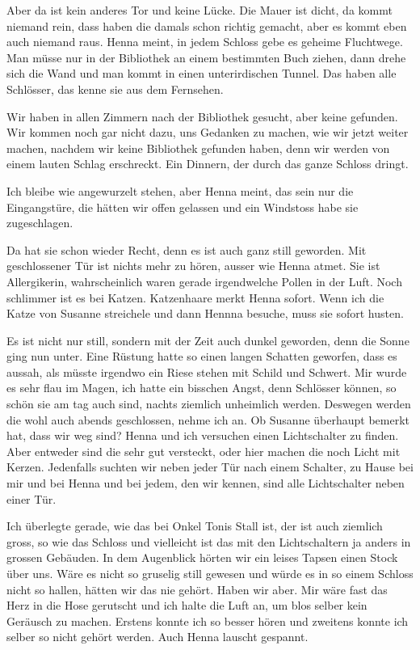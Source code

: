 Aber da ist kein anderes Tor und keine Lücke. Die Mauer ist dicht, da kommt niemand rein, dass haben die damals schon richtig gemacht, aber es kommt eben auch niemand raus. Henna meint, in jedem Schloss gebe es geheime Fluchtwege. Man müsse nur in der Bibliothek an einem bestimmten Buch ziehen, dann drehe sich die Wand und man kommt in einen unterirdischen Tunnel. Das haben alle Schlösser, das kenne sie aus dem Fernsehen.

Wir haben in allen Zimmern nach der Bibliothek gesucht, aber keine gefunden. Wir kommen noch gar nicht dazu, uns Gedanken zu machen, wie wir jetzt weiter machen, nachdem wir keine Bibliothek gefunden haben, denn wir werden von einem lauten Schlag erschreckt. Ein Dinnern, der durch das ganze Schloss dringt.

Ich bleibe wie angewurzelt stehen, aber Henna meint, das sein nur die Eingangstüre, die hätten wir offen gelassen und ein Windstoss habe sie zugeschlagen.

Da hat sie schon wieder Recht, denn es ist auch ganz still geworden. Mit geschlossener Tür ist nichts mehr zu hören, ausser wie Henna atmet. Sie ist Allergikerin, wahrscheinlich waren gerade irgendwelche Pollen in der Luft. Noch schlimmer ist es bei Katzen. Katzenhaare merkt Henna sofort. Wenn ich die Katze von Susanne streichele und dann Hennna besuche, muss sie sofort husten.

Es ist nicht nur still, sondern mit der Zeit auch dunkel geworden, denn die Sonne ging nun unter. Eine Rüstung hatte so einen langen Schatten geworfen, dass es aussah, als müsste irgendwo ein Riese stehen mit Schild und Schwert. Mir wurde es sehr flau im Magen, ich hatte ein bisschen Angst, denn Schlösser können, so schön sie am tag auch sind, nachts ziemlich unheimlich werden. Deswegen werden die wohl auch abends geschlossen, nehme ich an. Ob Susanne überhaupt bemerkt hat, dass wir weg sind? Henna und ich versuchen einen Lichtschalter zu finden. Aber entweder sind die sehr gut versteckt, oder hier machen die noch Licht mit Kerzen. Jedenfalls suchten wir neben jeder Tür nach einem Schalter, zu Hause bei mir und bei Henna und bei jedem, den wir kennen, sind alle Lichtschalter neben einer Tür.

Ich überlegte gerade, wie das bei Onkel Tonis Stall ist, der ist auch ziemlich gross, so wie das Schloss und vielleicht ist das mit den Lichtschaltern ja anders in grossen Gebäuden. In dem Augenblick hörten wir ein leises Tapsen einen Stock über uns. Wäre es nicht so gruselig still gewesen und würde es in so einem Schloss nicht so hallen, hätten wir das nie gehört. Haben wir aber. Mir wäre fast das Herz in die Hose gerutscht und ich halte die Luft an, um blos selber kein Geräusch zu machen. Erstens konnte ich so besser hören und zweitens konnte ich selber so nicht gehört werden. Auch Henna lauscht gespannt.

